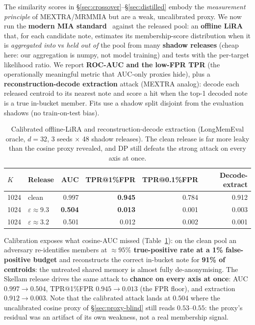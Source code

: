 \documentclass[pdflatex,sn-mathphys-num,12pt]{sn-jnl}
\theoremstyle{thmstyleone}%
\theoremstyle{thmstyletwo}%
\theoremstyle{thmstylethree}%
\newcommand{\eps}{\varepsilon}
\newcommand{\secref}[1]{\S\ref{#1}}
\begin{document}
The similarity scores in \secref{sec:crossover}--\secref{sec:distilled} embody the
\emph{measurement principle} of MEXTRA/MRMMIA but are a weak, uncalibrated proxy. We now run
the \textbf{modern MIA standard}~\cite{carlini2022lira} against the released pool: an \textbf{offline LiRA} that, for
each candidate note, estimates its membership-score distribution when it is \emph{aggregated
into} vs \emph{held out of} the pool from many \textbf{shadow releases} (cheap here: our
aggregation is numpy, not model training) and tests with the per-target likelihood ratio. We
report \textbf{ROC-AUC and the low-FPR TPR} (the operationally meaningful metric that AUC-only
proxies hide), plus a \textbf{reconstruction-decode extraction} attack (MEXTRA analog): decode
each released centroid to its nearest note and score a hit when the top-1 decoded note is a
true in-bucket member. Fits use a shadow split disjoint from the evaluation shadows (no
train-on-test bias).

\begin{table}[t]
  \centering
  \caption{Calibrated offline-LiRA and reconstruction-decode extraction (LongMemEval oracle,
  $d = 32$, 3 seeds $\times$ 48 shadow releases). The clean release is far more leaky than the
  cosine proxy revealed, and DP still defeats the strong attack on every axis at once.}
  \label{tab:lira}
  \begin{tabular}{@{}llrrrr@{}}
    \toprule
    $K$ & Release & AUC & TPR@1\%FPR & TPR@0.1\%FPR & Decode-extract \\
    \midrule
    1024 & clean               & 0.997          & \textbf{0.945} & 0.784 & 0.912 \\
    1024 & $\eps \approx 9.3$  & \textbf{0.504} & \textbf{0.013} & 0.001 & 0.003 \\
    1024 & $\eps \approx 3.2$  & 0.501          & 0.012          & 0.002 & 0.001 \\
    \bottomrule
  \end{tabular}
\end{table}

Calibration exposes what cosine-AUC missed (Table~\ref{tab:lira}): on the clean pool an
adversary re-identifies members at \textbf{${\approx}95\%$ true-positive rate at a 1\%
false-positive budget} and reconstructs the correct in-bucket note for \textbf{91\% of
centroids}: the untreated shared memory is almost fully de-anonymising. The Skellam release
drives the same attack to \textbf{chance on every axis at once}: AUC $0.997 \to 0.504$,
TPR@1\%FPR $0.945 \to 0.013$ (the FPR floor), and extraction $0.912 \to 0.003$. Note that the
calibrated attack lands at $0.504$ where the uncalibrated cosine proxy of
\secref{sec:proxy-blind} still reads $0.53$--$0.55$: the proxy's residual was an artifact of
its own weakness, not a real membership signal.
\end{document}
